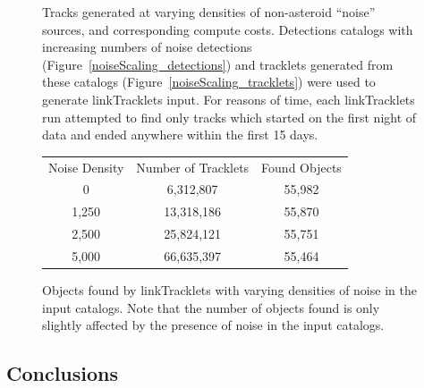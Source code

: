 \begin{figure}[ht!]

\caption{Tracks generated at varying densities of non-asteroid
  ``noise'' sources, and corresponding compute costs.  Detections
  catalogs with increasing numbers of noise detections
  (Figure~\ref{noiseScaling_detections}) and tracklets generated from
  these catalogs (Figure~\ref{noiseScaling_tracklets}) were used to generate
  linkTracklets input. For reasons of time, each linkTracklets run
  attempted to find only tracks which started on the first night of
  data and ended anywhere within the first 15 days.}
\label{noiseScaling_tracks}
\end{figure}


\begin{figure}[ht!]
\centering
\begin{tabular}{|c c c|}
\hline

Noise Density & Number of Tracklets & Found Objects \\
0 & 6,312,807 & 55,982 \\
1,250 & 13,318,186 & 55,870  \\
2,500 & 25,824,121 &  55,751  \\
5,000 & 66,635,397 &  55,464  \\
\hline
\end{tabular}

\caption{Objects found by linkTracklets with varying densities of
  noise in the input catalogs.  Note that the number of objects found
  is only slightly affected by the presence of noise in the input
  catalogs.}
\label{noiseScaling_found}
\end{figure}



\subsection{Conclusions}

